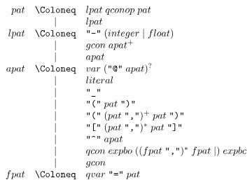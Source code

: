 \begin{align*}
  \begin{array}{rcl}
    {pat}
    & \Coloneq & {lpat}\; {qconop}\; {pat} \\
    & \mid & {lpat} \\
    {lpat}
    & \Coloneq & \text{\texttt{\textquotedbl -\textquotedbl}}\; ({integer} \mid {float}) \\
    & \mid & {gcon}\; {apat}^+ \\
    & \mid & {apat} \\
    {apat}
    & \Coloneq & {var}\; (\text{\texttt{\textquotedbl @\textquotedbl}}\; {apat})^? \\
    & \mid & {literal} \\
    & \mid & \text{\texttt{\textquotedbl\textunderscore\textquotedbl}} \\
    & \mid & \text{\texttt{\textquotedbl(\textquotedbl}}\; {pat}\; \text{\texttt{\textquotedbl)\textquotedbl}} \\
    & \mid & \text{\texttt{\textquotedbl(\textquotedbl}}\; ({pat}\; \text{\texttt{\textquotedbl,\textquotedbl}})^+\; {pat}\; \text{\texttt{\textquotedbl)\textquotedbl}} \\
    & \mid & \text{\texttt{\textquotedbl[\textquotedbl}}\; ({pat}\; \text{\texttt{\textquotedbl,\textquotedbl}})^*\; {pat}\; \text{\texttt{\textquotedbl]\textquotedbl}} \\
    & \mid & \text{\texttt{\textquotedbl\textasciicircum\textquotedbl}}\; {apat} \\
    & \mid & {qcon}\; {expbo}\; (({fpat}\; \text{\texttt{\textquotedbl,\textquotedbl}})^*\; {fpat} \mid )\; {expbc} \\
    & \mid & {gcon} \\
    {fpat}
    & \Coloneq & {qvar}\; \text{\texttt{\textquotedbl =\textquotedbl}}\; {pat}
  \end{array}
\end{align*}

